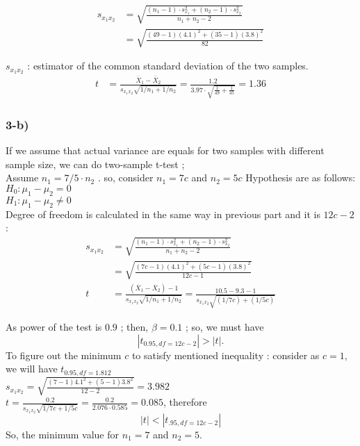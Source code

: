 \documentclass[10pt,a4paper]{article}
\begin{document}
\begin{align*}
s_{x_{1}x_{2}} &= \sqrt{ \frac{ (n_{1}-1) \cdot s_{x_{1}}^2 + (n_{2}-1) \cdot s_{x_{2}}^2 }
{n_{1}+n_{2}-2} } \\
&= \sqrt{ \frac{(49-1)(4.1)^{2} + (35-1)(3.8)^{2}} {82}  }
\end{align*}

$s_{x_{1}x_{2}}$ : estimator of the common standard deviation of the two
samples.\\

\begin{align*}
t &= \frac{\overline{X}_{1} -\overline{X}_{2}}{s_{x_{1}x_{2}}\sqrt{1/n_{1} + 1/n_{2}}} =
 \frac{1.2}{3.97 \cdot \sqrt{\frac{1}{49} + \frac{1}{35}}} = 1.36
\end{align*}



\subsubsection*{3-b)}

If we assume that actual variance are equals for two samples with different sample size, we can do two-sample t-test  ; \\
Assume $n_{1} = 7/5 \cdot n_{2} $ . so, consider $n_{1} = 7c $ and $n_{2} = 5c$ Hypothesis are as follows: \\
$H_{0} : \mu_{1} -\mu_{2} = 0 $ \\
$H_{1} : \mu_{1} -\mu_{2} \neq 0 $ \\
Degree of freedom is calculated in the same way in  previous part and  it is $12c-2$ : \\
\begin{align*}
s_{x_{1}x_{2}} &= \sqrt{ \frac{ (n_{1}-1) \cdot s_{x_{1}}^2 + (n_{2}-1) \cdot s_{x_{2}}^2}{n_{1}+n_{2}-2}   } \\
&= \sqrt{ \frac{(7c-1)(4.1)^{2} + (5c-1)(3.8)^{2}}{12c-1}  } \\ 
t &= \frac{(\overline{X}_{1} -\overline{X}_{2})-1 } {s_{x_{1}x_{2}}\sqrt{1/n_{1} + 1/n_{2}}} = \frac{10.5-9.3-1}{s_{x_{1}x_{2}}\sqrt{ ( 1/7c) + (1/5c) }} 
\end{align*}

As power of the test is $0.9$ ; then, $\beta = 0.1$ ; so, we must have 
\[ |t_{0.95, df = 12c-2}| > |t|
.\]
To figure out the minimum $c$ to satisfy mentioned inequality : consider as $c =1$, we will have $t_{0.95, df = 1.812}$ \\


$s_{x_{1}x_{2}} = \sqrt{\frac{(7 - 1) 4.1^2 + (5 - 1) 3.8^2}{12 - 2}} = 3.982$ \\
$t = \frac{0.2}{s_{x_{1}x_{2}} \sqrt{1/{7c} + 1/{5c}}} = \frac{0.2}{2.076 \cdot 0.585} = 0.085$,
therefore
\[
|t| < |t_{.95, df = 12c - 2}|
\] 
So, the minimum value for $n_1 = 7$ and $n_2 = 5$.
\end{document}
